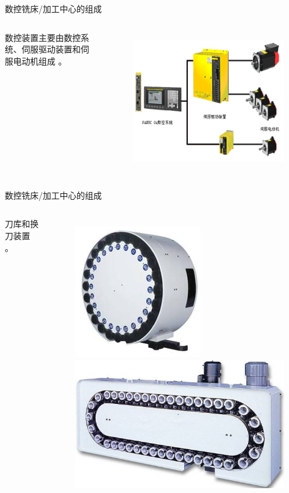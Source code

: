 \documentclass[UTF8,zihao=-4]{ctexbeamer}
\begin{document}
\begin{frame}{数控铣床/加工中心的组成}
\begin{columns}
	数控装置主要由数控系统、伺服驱动装置和伺服电动机组成 。 
	\begin{figure}
		\centering
		\includegraphics[width= 0.8\linewidth]{image/1-11}
		\label{fig:1-12}
	\end{figure}
\end{columns}
\end{frame}

\begin{frame}{数控铣床/加工中心的组成}
\begin{columns}
	刀库和换刀装置  。 
	\begin{figure}
		\centering
		\includegraphics[width= 0.5\linewidth]{image/1-12}
		\includegraphics[width= 0.5\linewidth]{image/1-13}
		\label{fig:1-13}
	\end{figure}

\end{columns}
\end{frame}
\end{document}
